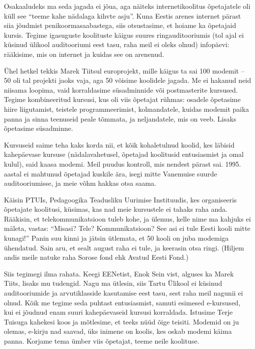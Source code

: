 Osakaaludeks ma seda jagada ei jõua, aga näiteks internetikoolitus
õpetajatele oli küll see \enquote{teeme kahe nädalaga kihvte asju}. Kuna Eestis
arenes internet pärast siia jõudmist
penikoormasaabastega, siis otsustasime, et hoiame ka õpetajaid
kursis. Tegime igasuguste koolituste käigus suures ringauditooriumis (tol
ajal ei küsinud ülikool auditooriumi eest tasu, raha meil ei oleks
olnud) infopäevi: rääkisime, mis on internet ja kuidas see on arenenud.

Ühel hetkel tekkis Marek Tiitsul
europrojekt, mille käigus ta sai 100 modemit -- 50 oli tal projekti jaoks vaja,
aga 50 võisime koolidele jagada. Me ei hakanud neid niisama loopima, vaid
korraldasime süsadminnide või postmasterite kursused. Tegime
kombineeritud kursusi, kus oli viis õpetajat rühmas: osadele
õpetasime hiire liigutamist, teistele programmeerimist,
kolmandatele, kuidas modemit paika panna ja sinna teenuseid peale
tõmmata, ja neljandatele, mis on veeb. Lisaks õpetasime
süsadminne.

Kursuseid saime teha kaks korda nii, et kõik
kohaletulnud koolid, kes läbisid kahepäevase kursuse (nädalavahetusel, õpetajad koolitusid entusiasmist ja omal kulul),
said kaasa modemi. Meil puudus kontroll, mis nendest pärast sai. 1995.
aastal ei mahtunud õpetajad kuskile ära, isegi mitte Vanemuise
suurde auditooriumisse, ja meie võhm hakkas otsa
saama.

Käisin PTUIs, Pedagoogika Teadusliku Uurimise Instituudis, kes
organiseeris õpetajate koolitusi, küsimas, kas nad meie kursustele ei tahaks
raha anda. Rääkisin, et telekommunikatsioon tuleb kohe, ja
ülemus, kelle nime ma kahjuks ei mäleta, vastas: \enquote{Misasi? Tele?
Kommunikatsioon? See asi ei tule Eesti kooli mitte kunagi!} Panin suu kinni
ja jätsin ütlemata, et 50 kooli on juba modemiga ühendatud. Sain aru, et sealt august raha ei tule, ja keerasin otsa
ringi. (Hiljem andis meile natuke raha Sorose
fond ehk Avatud Eesti Fond.)

Siis tegimegi ilma rahata. Keegi EENetist, Enok Sein vist, alguses ka Marek Tiits, lisaks mu
tudengid. Nagu ma ütlesin, siis Tartu Ülikool ei küsinud
auditooriumide ja arvutiklasside kasutamise eest tasu, sest raha meil nagunii ei olnud.
Kõik me tegime seda puhtast entusiasmist, samuti esimesed e-kursused, kui ei jõudnud enam suuri kahepäevaseid kursusi
korraldada. Istusime Terje Tuisuga kahekesi
koos ja mõtlesime, et teeks nüüd õige teisiti. Modemid on ju olemas,
e-kirju nad saavad, üks inimene on koolis, kes oskab modemi käima panna.
Korjame tema ümber viis õpetajat, teeme neile koolituse.

